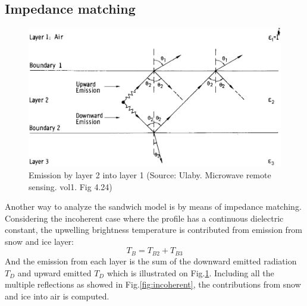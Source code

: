 \subsection{Impedance matching}
\begin{figure}[!hbp]
  \centering
   \includegraphics[scale=0.2]{incoherent_layer.eps} 
  \caption{Emission by layer 2 into layer 1 (Source: Ulaby. Microwave remote sensing. vol1. Fig 4.24)}
  \label{fig:incoherent_layer}
\end{figure}
Another way to analyze the sandwich model is by means of impedance matching. Considering the incoherent case where the profile has a continuous dielectric constant, the upwelling brightness temperature is contributed from emission from snow and ice layer:
\begin{equation*}
  T_B = T_{B2}+T_{B3}
\end{equation*}
And the emission from each layer is the sum of the downward emitted radiation $T_D$ and upward emitted $T_D$ which is illustrated on Fig.\ref{fig:incoherent_layer}. Including all the multiple reflections as showed in Fig.\ref{fig:incoherent}, the contributions from snow and ice into air is computed.
